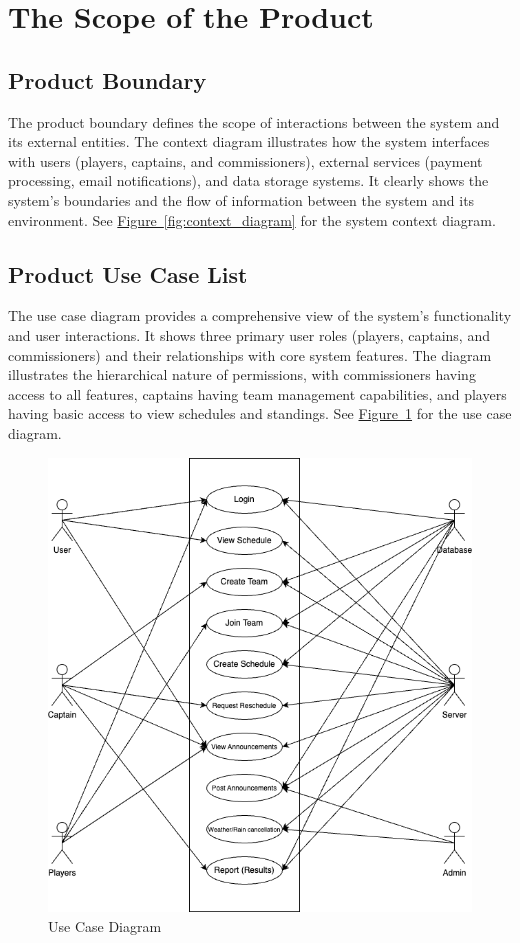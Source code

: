 \documentclass[12pt, titlepage]{article}
\begin{document}
\section{The Scope of the Product}
\subsection{Product Boundary}
The product boundary defines the scope of interactions between the system and its external entities. The context diagram illustrates how the system interfaces with users (players, captains, and commissioners), external services (payment processing, email notifications), and data storage systems. It clearly shows the system's boundaries and the flow of information between the system and its environment. See \hyperref[fig:context_diagram]{Figure~\ref{fig:context_diagram}} for the system context diagram.

\subsection{Product Use Case List}
The use case diagram provides a comprehensive view of the system's functionality and user interactions. It shows three primary user roles (players, captains, and commissioners) and their relationships with core system features. The diagram illustrates the hierarchical nature of permissions, with commissioners having access to all features, captains having team management capabilities, and players having basic access to view schedules and standings. See \hyperref[fig:use_case]{Figure~\ref{fig:use_case}} for the use case diagram.

\begin{figure}[H]
    \centering
    \includegraphics[width=\linewidth]{Use_case.png}
    \caption{Use Case Diagram}
    \label{fig:use_case}
\end{figure}
\pagebreak
\end{document}
